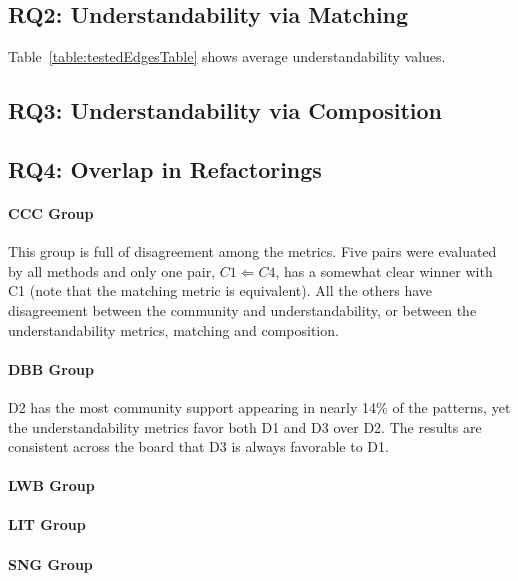 \subsection{RQ2: Understandability via Matching}
Table~\ref{table:testedEdgesTable} shows average understandability values. 




\subsection{RQ3: Understandability via Composition}

\subsection{RQ4: Overlap in Refactorings}

\paragraph{CCC Group}
This group is full of disagreement among the metrics. Five pairs were evaluated by all methods and only one pair, $C1 \Leftarrow C4$, has a somewhat clear winner with C1 (note that the matching metric is equivalent). All the others have disagreement between the community and understandability, or between the understandability metrics, matching and composition. 


\paragraph{DBB Group}
D2 has the most community support appearing in nearly 14\% of the patterns, yet the understandability metrics favor both D1 and D3 over D2. The results are consistent across the board that D3 is always favorable to D1. 

\paragraph{LWB Group}

\paragraph{LIT Group}

\paragraph{SNG Group}





